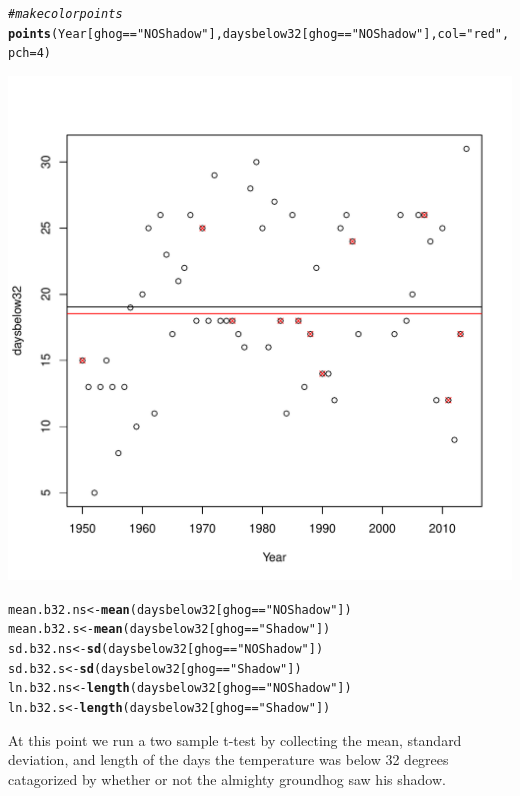 \documentclass[12pt]{article}\usepackage[]{graphicx}\usepackage[]{color}
\makeatletter
\def\maxwidth{ %
  \ifdim\Gin@nat@width>\linewidth
    \linewidth
  \else
    \Gin@nat@width
  \fi
}
\newcommand{\hlnum}[1]{\textcolor[rgb]{0.686,0.059,0.569}{#1}}%
\newcommand{\hlstr}[1]{\textcolor[rgb]{0.192,0.494,0.8}{#1}}%
\newcommand{\hlcom}[1]{\textcolor[rgb]{0.678,0.584,0.686}{\textit{#1}}}%
\newcommand{\hlopt}[1]{\textcolor[rgb]{0,0,0}{#1}}%
\newcommand{\hlstd}[1]{\textcolor[rgb]{0.345,0.345,0.345}{#1}}%
\newcommand{\hlkwb}[1]{\textcolor[rgb]{0.69,0.353,0.396}{#1}}%
\newcommand{\hlkwc}[1]{\textcolor[rgb]{0.333,0.667,0.333}{#1}}%
\newcommand{\hlkwd}[1]{\textcolor[rgb]{0.737,0.353,0.396}{\textbf{#1}}}%
\newenvironment{kframe}{%
 \def\at@end@of@kframe{}%
 \ifinner\ifhmode%
  \def\at@end@of@kframe{\end{minipage}}%
  \begin{minipage}{\columnwidth}%
 \fi\fi%
 \def\FrameCommand##1{\hskip\@totalleftmargin \hskip-\fboxsep
 \colorbox{shadecolor}{##1}\hskip-\fboxsep
     \hskip-\linewidth \hskip-\@totalleftmargin \hskip\columnwidth}%
 \MakeFramed {\advance\hsize-\width
   \@totalleftmargin\z@ \linewidth\hsize
   \@setminipage}}%
 {\par\unskip\endMakeFramed%
 \at@end@of@kframe}
\newenvironment{knitrout}{}{} %
\makeatother
\begin{document}
\begin{knitrout}
\begin{kframe}
\begin{alltt}
\hlcom{# make color points}
\hlkwd{points}\hlstd{(Year[ghog}\hlopt{==}\hlstr{"NOShadow"}\hlstd{],daysbelow32[ghog}\hlopt{==}\hlstr{"NOShadow"}\hlstd{],}\hlkwc{col}\hlstd{=}\hlstr{"red"}\hlstd{,}\hlkwc{pch}\hlstd{=}\hlnum{4}\hlstd{)}
\end{alltt}
\end{kframe}
\includegraphics[width=\maxwidth]{figure/manipulation-1} 
\begin{kframe}\begin{alltt}
\hlstd{mean.b32.ns} \hlkwb{<-} \hlkwd{mean}\hlstd{(daysbelow32[ghog}\hlopt{==}\hlstr{"NOShadow"}\hlstd{])}
\hlstd{mean.b32.s} \hlkwb{<-} \hlkwd{mean}\hlstd{(daysbelow32[ghog}\hlopt{==}\hlstr{"Shadow"}\hlstd{])}
\hlstd{sd.b32.ns} \hlkwb{<-} \hlkwd{sd}\hlstd{(daysbelow32[ghog}\hlopt{==}\hlstr{"NOShadow"}\hlstd{])}
\hlstd{sd.b32.s} \hlkwb{<-} \hlkwd{sd}\hlstd{(daysbelow32[ghog}\hlopt{==}\hlstr{"Shadow"}\hlstd{])}
\hlstd{ln.b32.ns} \hlkwb{<-} \hlkwd{length}\hlstd{(daysbelow32[ghog}\hlopt{==}\hlstr{"NOShadow"}\hlstd{])}
\hlstd{ln.b32.s} \hlkwb{<-} \hlkwd{length}\hlstd{(daysbelow32[ghog}\hlopt{==}\hlstr{"Shadow"}\hlstd{])}
\end{alltt}
\end{kframe}
\end{knitrout}

At this point we run a two sample t-test by collecting the mean, standard deviation, and length of the days the temperature was below 32 degrees catagorized by whether or not the almighty groundhog saw his shadow.
\end{document}
